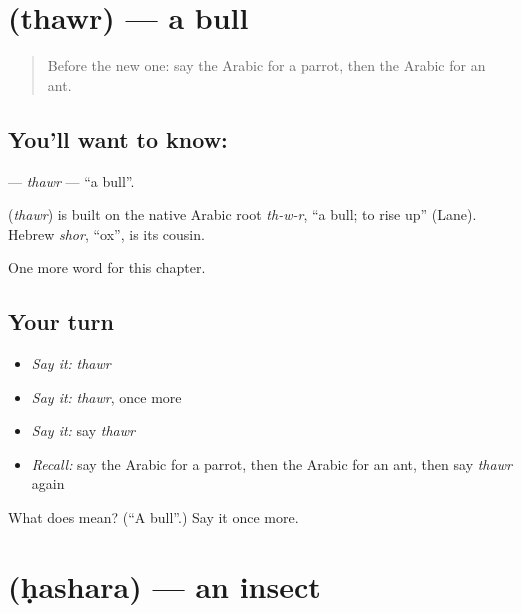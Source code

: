 \section[\texorpdfstring{\ar{ثور} (thawr)}{ثور (thawr)}]{ (thawr) — a bull}

\label{lesson:AR-C185-thawr}



\begin{quote}
Before the new one: say the Arabic for a parrot, then the Arabic for an ant.
\end{quote}

\subsection*{You'll want to know: }
\textbf{} — \emph{thawr} — \textquotedblleft{}a bull\textquotedblright{}.

\begin{cousinweb}
\textbf{} (\emph{thawr}) is built on the native Arabic root \emph{th-w-r}, \textquotedblleft{}a bull; to rise up\textquotedblright{} (Lane). Hebrew \emph{shor}, \textquotedblleft{}ox\textquotedblright{}, is its cousin.
\end{cousinweb}

\begin{grammarlens}[title={What you've built}]
One more word for this chapter.
\end{grammarlens}

\subsection*{Your turn}
\begin{itemize}
\raggedright
  \item \emph{Say it:} \emph{thawr}
  \item \emph{Say it:} \emph{thawr}, once more
  \item \emph{Say it:} say \emph{thawr}
  \item \emph{Recall:} say the Arabic for a parrot, then the Arabic for an ant, then say \emph{thawr} again
\end{itemize}

\begin{tcolorbox}[breakable,colback=teal!4,colframe=teal!35!black,title={Before you move on}]
What does  mean? (\textquotedblleft{}A bull\textquotedblright{}.) Say it once more.
\end{tcolorbox}
\section[\texorpdfstring{\ar{حشرة} (ḥashara)}{حشرة (ḥashara)}]{ (ḥashara) — an insect}

